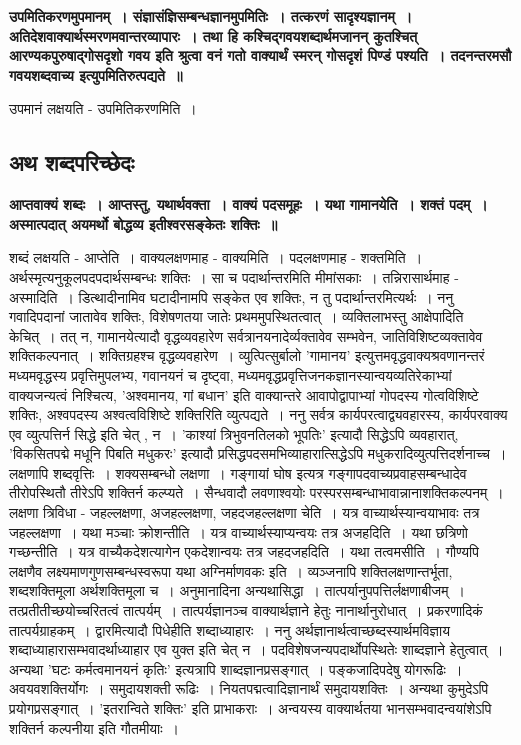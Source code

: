 {\bfseries उपमितिकरणमुपमानम्~। संज्ञासंज्ञिसम्बन्धज्ञानमुपमितिः~। तत्करणं सादृश्यज्ञानम्~। अतिदेशवाक्यार्थस्मरणमवान्तरव्यापारः~। तथा हि कश्चिद्गवयशब्दार्थमजानन् कुतश्चित् आरण्यकपुरुषाद्गोसदृशो गवय इति श्रुत्वा वनं गतो वाक्यार्थं स्मरन् गोसदृशं पिण्डं पश्यति~। तदनन्तरमसौ गवयशब्दवाच्य इत्युपमितिरुत्पद्यते~॥}\par
	उपमानं लक्षयति - उपमितिकरणमिति~। \subsection*{अथ शब्दपरिच्छेदः}
{\bfseries आप्तवाक्यं शब्दः~। आप्तस्तु, यथार्थवक्ता~। वाक्यं पदसमूहः~। यथा गामानयेति~। शक्तं पदम्~। अस्मात्पदात् अयमर्थो बोद्धव्य इतीश्वरसङ्केतः शक्तिः~॥}\par
	शब्दं लक्षयति - आप्तेति~। वाक्यलक्षणमाह - वाक्यमिति~। पदलक्षणमाह - शक्तमिति~। अर्थस्मृत्यनुकूलपदपदार्थसम्बन्धः शक्तिः~। सा च पदार्थान्तरमिति मीमांसकाः~। तन्निरासार्थमाह - अस्मादिति~। डित्थादीनामिव घटादीनामपि सङ्केत एव शक्तिः, न तु पदार्थान्तरमित्यर्थः~। ननु गवादिपदानां जातावेव शक्तिः, विशेषणतया जातेः प्रथममुपस्थितत्वात्~। व्यक्तिलाभस्तु आक्षेपादिति केचित्~। तत् न, गामानयेत्यादौ वृद्धव्यवहारेण सर्वत्रानयनादेर्व्यक्तावेव सम्भवेन, जातिविशिष्टव्यक्तावेव शक्तिकल्पनात्~। शक्तिग्रहश्च वृद्धव्यवहारेण~। व्युत्पित्सुर्बालो ’गामानय’ इत्युत्तमवृद्धवाक्यश्रवणानन्तरं मध्यमवृद्धस्य प्रवृत्तिमुपलभ्य, गवानयनं च दृष्ट्वा, मध्यमवृद्धप्रवृत्तिजनकज्ञानस्यान्वयव्यतिरेकाभ्यां वाक्यजन्यत्वं निश्चित्य, ’अश्वमानय, गां बधान’ इति वाक्यान्तरे आवापोद्वापाभ्यां गोपदस्य गोत्वविशिष्टे शक्तिः, अश्वपदस्य अश्वत्वविशिष्टे शक्तिरिति व्युत्पद्यते~। ननु सर्वत्र कार्यपरत्वाद्व्यवहारस्य, कार्यपरवाक्य एव व्युत्पत्तिर्न सिद्धे इति चेत् , न~। ’काश्यां त्रिभुवनतिलको भूपतिः’ इत्यादौ सिद्धेऽपि व्यवहारात्, ’विकसितपद्मे मधूनि पिबति मधुकरः’ इत्यादौ प्रसिद्धपदसमभिव्याहारात्सिद्धेऽपि मधुकरादिव्युत्पत्तिदर्शनाच्च~। लक्षणापि शब्दवृत्तिः~। शक्यसम्बन्धो लक्षणा~। गङ्गायां घोष इत्यत्र गङ्गापदवाच्यप्रवाहसम्बन्धादेव तीरोपस्थितौ तीरेऽपि शक्तिर्न कल्प्यते~। सैन्धवादौ लवणाश्वयोः परस्परसम्बन्धाभावान्नानाशक्तिकल्पनम्~। लक्षणा त्रिविधा - जहल्लक्षणा, अजहल्लक्षणा, जहदजहल्लक्षणा चेति~। यत्र वाच्यार्थस्यान्वयाभावः तत्र जहल्लक्षणा~। यथा मञ्चाः क्रोशन्तीति~। यत्र वाच्यार्थस्याप्यन्वयः तत्र अजहदिति~। यथा छत्रिणो गच्छन्तीति~। यत्र वाच्यैकदेशत्यागेन एकदेशान्वयः तत्र जहदजहदिति~। यथा तत्वमसीति~। गौण्यपि लक्षणैव लक्ष्यमाणगुणसम्बन्धस्वरूपा यथा अग्निर्माणवकः इति~। व्यञ्जनापि शक्तिलक्षणान्तर्भूता, शब्दशक्तिमूला अर्थशक्तिमूला च~। अनुमानादिना अन्यथासिद्धा~। तात्पर्यानुपपत्तिर्लक्षणाबीजम्~। तत्प्रतीतीच्छयोच्चरितत्वं तात्पर्यम्~। तात्पर्यज्ञानञ्च वाक्यार्थज्ञाने हेतुः नानार्थानुरोधात्~। प्रकरणादिकं तात्पर्यग्राहकम्~। द्वारमित्यादौ पिधेहीति शब्दाध्याहारः~। ननु अर्थज्ञानार्थत्वाच्छब्दस्यार्थमविज्ञाय शब्दाध्याहारासम्भवादर्थाध्याहार एव युक्त इति चेत् न~। पदविशेषजन्यपदार्थोपस्थितेः शाब्दज्ञाने हेतुत्वात्~। अन्यथा ’घटः कर्मत्वमानयनं कृतिः’ इत्यत्रापि शाब्दज्ञानप्रसङ्गात्~। पङ्कजादिपदेषु योगरूढिः~। अवयवशक्तिर्योगः~। समुदायशक्ती रूढिः~। नियतपद्मत्वादिज्ञानार्थं समुदायशक्तिः~। अन्यथा कुमुदेऽपि प्रयोगप्रसङ्गात्~। ’इतरान्विते शक्तिः’ इति प्राभाकराः~। अन्वयस्य वाक्यार्थतया भानसम्भवादन्वयांशेऽपि शक्तिर्न कल्पनीया इति गौतमीयाः~।\\[10pt]
